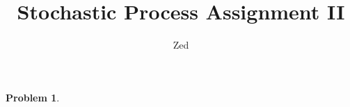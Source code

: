 \documentclass[a4paper, 10pt]{article}
\title{\textbf{Stochastic Process Assignment II}}
\author{Zed}
\theoremstyle{definition}
\newtheorem{problem}{Problem}
\theoremstyle{hSol}
\begin{document}
\maketitle
\begin{problem} 
\end{problem}
\end{document}

